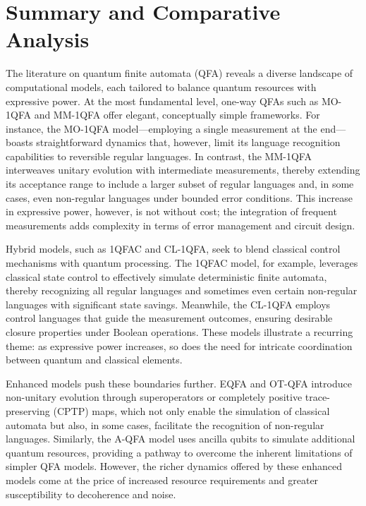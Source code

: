 \section{Summary and Comparative Analysis}
\label{sec:summary-comparative}

The literature on quantum finite automata (QFA) reveals a diverse landscape of computational models, each tailored to balance quantum resources with expressive power. At the most fundamental level, one-way QFAs such as MO-1QFA and MM-1QFA offer elegant, conceptually simple frameworks. For instance, the MO-1QFA model—employing a single measurement at the end—boasts straightforward dynamics that, however, limit its language recognition capabilities to reversible regular languages. In contrast, the MM-1QFA interweaves unitary evolution with intermediate measurements, thereby extending its acceptance range to include a larger subset of regular languages and, in some cases, even non-regular languages under bounded error conditions. This increase in expressive power, however, is not without cost; the integration of frequent measurements adds complexity in terms of error management and circuit design.

Hybrid models, such as 1QFAC and CL-1QFA, seek to blend classical control mechanisms with quantum processing. The 1QFAC model, for example, leverages classical state control to effectively simulate deterministic finite automata, thereby recognizing all regular languages and sometimes even certain non-regular languages with significant state savings. Meanwhile, the CL-1QFA employs control languages that guide the measurement outcomes, ensuring desirable closure properties under Boolean operations. These models illustrate a recurring theme: as expressive power increases, so does the need for intricate coordination between quantum and classical elements.

Enhanced models push these boundaries further. EQFA and OT-QFA introduce non-unitary evolution through superoperators or completely positive trace-preserving (CPTP) maps, which not only enable the simulation of classical automata but also, in some cases, facilitate the recognition of non-regular languages. Similarly, the A-QFA model uses ancilla qubits to simulate additional quantum resources, providing a pathway to overcome the inherent limitations of simpler QFA models. However, the richer dynamics offered by these enhanced models come at the price of increased resource requirements and greater susceptibility to decoherence and noise.

